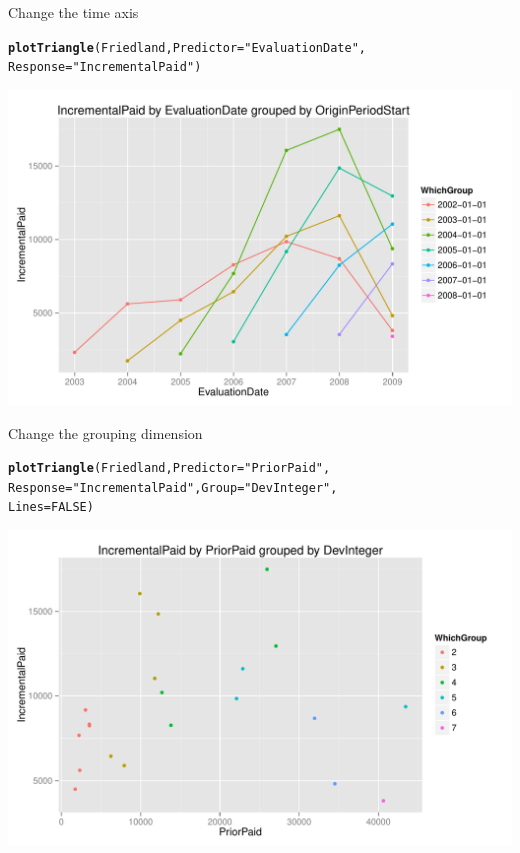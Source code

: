 \documentclass[xcolor=dvipsnames]{beamer}\usepackage{graphicx, color}
\makeatletter
\def\maxwidth{ %
  \ifdim\Gin@nat@width>\linewidth
    \linewidth
  \else
    \Gin@nat@width
  \fi
}
\newcommand{\hlfunctioncall}[1]{\textcolor[rgb]{0.501960784313725,0,0.329411764705882}{\textbf{#1}}}%
\newcommand{\hlstring}[1]{\textcolor[rgb]{0.6,0.6,1}{#1}}%
\newenvironment{kframe}{%
 \def\at@end@of@kframe{}%
 \ifinner\ifhmode%
  \def\at@end@of@kframe{\end{minipage}}%
  \begin{minipage}{\columnwidth}%
 \fi\fi%
 \def\FrameCommand##1{\hskip\@totalleftmargin \hskip-\fboxsep
 \colorbox{shadecolor}{##1}\hskip-\fboxsep
     \hskip-\linewidth \hskip-\@totalleftmargin \hskip\columnwidth}%
 \MakeFramed {\advance\hsize-\width
   \@totalleftmargin\z@ \linewidth\hsize
   \@setminipage}}%
 {\par\unskip\endMakeFramed%
 \at@end@of@kframe}
\newenvironment{knitrout}{}{} %
\makeatother
\begin{document}
\begin{frame}[fragile]{Change the time axis}
\begin{knitrout}
\color{fgcolor}\begin{kframe}
\begin{alltt}
\hlfunctioncall{plotTriangle}(Friedland, Predictor = \hlstring{"EvaluationDate"}, 
    Response = \hlstring{"IncrementalPaid"})
\end{alltt}
\end{kframe}
\includegraphics[width=\maxwidth]{figure/Friedland3} 

\end{knitrout}

\end{frame}

\begin{frame}[fragile]{Change the grouping dimension}
\begin{knitrout}
\color{fgcolor}\begin{kframe}
\begin{alltt}
\hlfunctioncall{plotTriangle}(Friedland, Predictor = \hlstring{"PriorPaid"}, 
    Response = \hlstring{"IncrementalPaid"}, Group = \hlstring{"DevInteger"}, 
    Lines = FALSE)
\end{alltt}
\end{kframe}
\includegraphics[width=\maxwidth]{figure/FriedlandCL1} 

\end{knitrout}

\end{frame}
\end{document}
